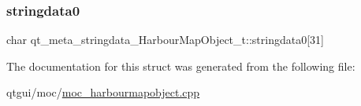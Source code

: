 \subsubsection{\texorpdfstring{stringdata0}{stringdata0}}
{\footnotesize\ttfamily char qt\+\_\+meta\+\_\+stringdata\+\_\+\+Harbour\+Map\+Object\+\_\+t\+::stringdata0\mbox{[}31\mbox{]}}



The documentation for this struct was generated from the following file\+:\begin{DoxyCompactItemize}
\item 
qtgui/moc/\mbox{\hyperlink{moc__harbourmapobject_8cpp}{moc\+\_\+harbourmapobject.\+cpp}}\end{DoxyCompactItemize}
